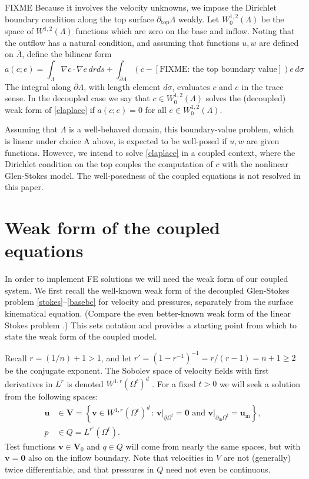 \documentclass[letterpaper,final,12pt,reqno]{amsart}
\newcommand{\grad}{\nabla}
\newcommand{\bu}{\mathbf{u}}
\newcommand{\bv}{\mathbf{v}}
\newcommand{\bV}{\mathbf{V}}
\newcommand{\bzero}{\bm{0}}
\begin{document}
FIXME Because it involves the velocity unknowns, we impose the Dirichlet boundary condition along the top surface $\partial_{\text{top}} \Lambda$ weakly.  Let $W_0^{1,2}(\Lambda)$ be the space of $W^{1,2}(\Lambda)$ functions which are zero on the base and inflow.  Noting that the outflow has a natural condition, and assuming that functions $u,w$ are defined on $\overline\Lambda$, define the bilinear form
\begin{equation}
a(c;e) = \int_\Lambda \grad c \cdot \grad e \,dr ds + \int_{\overline{\partial} \Lambda} \left(c - [\text{FIXME: the top boundary value}]\right) e\,d\sigma \label{surfaceweakform}
\end{equation}
The integral along $\overline{\partial} \Lambda$, with length element $d\sigma$, evaluates $c$ and $e$ in the trace sense.  In the decoupled case we say that $c \in W_0^{1,2}(\Lambda)$ solves the (decoupled) weak form of \eqref{claplace} if $a(c;e)=0$ for all $e \in W_0^{1,2}(\Lambda)$.

Assuming that $\Lambda$ is a well-behaved domain, this boundary-value problem, which is linear under choice A above, is expected to be well-posed if $u,w$ are given functions.  However, we intend to solve \eqref{claplace} in a coupled context, where the Dirichlet condition on the top couples the computation of $c$ with the nonlinear Glen-Stokes model.  The well-posedness of the coupled equations is not resolved in this paper.

\section{Weak form of the coupled equations} \label{sec:weakformcoupled}

In order to implement FE solutions we will need the weak form of our coupled system.  We first recall the well-known weak form of the decoupled Glen-Stokes problem \eqref{stokes}--\eqref{basebc} \cite{JouvetRappaz2011} for velocity and pressures, separately from the surface kinematical equation.  (Compare the even better-known weak form of the linear Stokes problem \cite{Bueler2021,Elmanetal2014}.)  This sets notation and provides a starting point from which to state the weak form of the coupled model.

Recall $r=(1/n) + 1>1$, and let $r'=(1-r^{-1})^{-1}=r/(r-1)=n+1\ge 2$ be the conjugate exponent.  The Sobolev space of velocity fields with first derivatives in $L^r$ is denoted $W^{1,r}(\Omega^t)^d$ \cite{Evans2010}.  For a fixed $t>0$ we will seek a solution from the following spaces:
\begin{align*}
\bu &\in \bV = \left\{\bv \in W^{1,r}(\Omega^t)^d\,:\,\bv\big|_{\underline{\partial} \Omega^t}=\bzero \text{ and } \bv\big|_{\partial_{\text{in}} \Omega^t} = \bu_{\text{in}}\right\}, \\
p &\in Q = L^{r'}(\Omega^t).
\end{align*}
Test functions $\bv \in \bV_0$ and $q\in Q$ will come from nearly the same spaces, but with $\bv=\bzero$ also on the inflow boundary.  Note that velocities in $V$ are not (generally) twice differentiable, and that pressures in $Q$ need not even be continuous.
\end{document}
